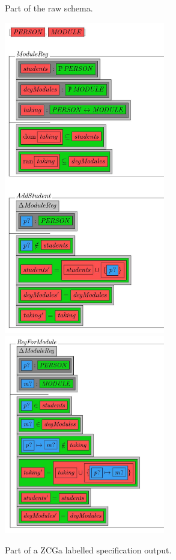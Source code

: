\begin{figure}[H]
\begin{minipage}{0.45\textwidth}
\begin{tiny}
\begin{BVerbatim}[commandchars=+\[\]]
\end{BVerbatim}
\end{tiny}
\caption{Part of the raw schema.\label{fig:zcgaschema}}
\end{minipage}\hfill
\begin{minipage}{0.45\textwidth}
\centering
\centering
\includegraphics[width=7cm]{Figures/fullexample/1a.jpg}
\includegraphics[width=7cm]{Figures/fullexample/2b.jpg}

\caption{Part of a ZCGa labelled specification output. \label{fig:zcgaschemaout}}
\end{minipage}
\end{figure}

